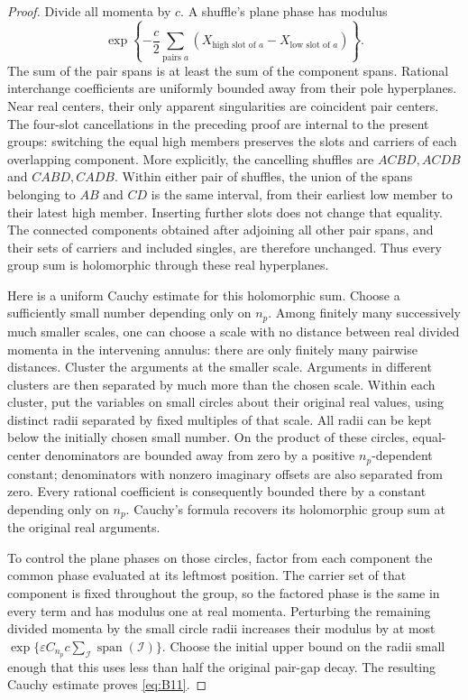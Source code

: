 \begin{proof}
Divide all momenta by \(c\).  A shuffle's plane phase has modulus
\[
 \exp\left\{-\frac c2
       \sum_{\text{pairs }a}
           (X_{\text{high slot of }a}
                 -X_{\text{low slot of }a})\right\}.
\]
The sum of the pair spans is at least the sum of the component
spans.  Rational interchange coefficients are uniformly bounded
away from their pole hyperplanes.  Near real centers, their only
apparent singularities are coincident pair centers.  The
four-slot cancellations in the preceding proof are internal to
the present groups: switching the equal high members preserves
the slots and carriers of each overlapping component.
More explicitly, the cancelling shuffles are
$ACBD,ACDB$ and $CABD,CADB$.  Within either pair of shuffles,
the union of the spans belonging to $AB$ and $CD$ is the same
interval, from their earliest low member to their latest high member.
Inserting further slots does not change that equality.  The connected
components obtained after adjoining all other pair spans, and their
sets of carriers and included singles, are therefore unchanged.
Thus every group sum is holomorphic through these real
hyperplanes.

Here is a uniform Cauchy estimate for this holomorphic sum.
Choose a sufficiently small number depending only on \(n_p\).
Among finitely many successively much smaller scales, one can
choose a scale with no distance between real divided momenta in
the intervening annulus: there are only finitely many pairwise
distances.  Cluster the arguments at the smaller scale.
Arguments in different clusters are then separated by much more
than the chosen scale.  Within each cluster, put the variables
on small circles about their original real values,
using distinct radii separated by fixed multiples of that scale.
All radii can be kept below the initially chosen small number.
On the product of these circles, equal-center denominators are
bounded away from zero by a positive \(n_p\)-dependent constant;
denominators with nonzero imaginary offsets are also separated
from zero.  Every rational coefficient is consequently bounded
there by a constant depending only on \(n_p\).  Cauchy's formula
recovers its holomorphic group sum at the original real arguments.

To control the plane phases on those circles, factor from each
component the common phase evaluated at its leftmost position.
The carrier set of that component is fixed throughout the group,
so the factored phase is the same in every term and has modulus
one at real momenta.  Perturbing the remaining divided momenta by
the small circle radii increases their modulus by at most
\(\exp\{\varepsilon C_{n_p}c\sum_{\mathcal I}
\operatorname{span}(\mathcal I)\}\).
Choose the initial upper bound on the radii small enough that
this uses less than half the original pair-gap decay.
The resulting Cauchy estimate proves \eqref{eq:B11}.
\end{proof}

